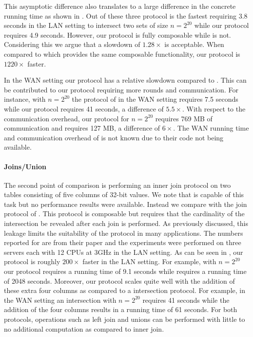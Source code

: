 This asymptotic difference also translates to a large difference in the concrete running time as shown in . Out of these three protocol \cite{CCS:KKRT16} is the fastest requiring 3.8 seconds in the LAN setting to intersect two sets of size $n=2^{20}$ while our protocol requires 4.9 seconds. However, our protocol is fully composable while \cite{CCS:KKRT16} is not. Considering this we argue that a slowdown of $1.28\times$ is acceptable. When compared to \cite{ASIACCS:BlaAgu12} which provides the same composable functionality, our protocol is $1220\times$ faster.

In the WAN setting our protocol has a relative slowdown compared to \cite{CCS:KKRT16}. This can be contributed to our protocol requiring more rounds and communication. For instance, with $n=2^{20}$ the protocol of \cite{CCS:KKRT16} in the WAN setting requires 7.5 seconds while our protocol requires 41 seconds, a difference of $5.5\times$. With respect to the communication overhead, our protocol for $n=2^{20}$ requires 769 MB of communication and \cite{CCS:KKRT16} requires 127 MB, a difference of $6\times$. The WAN running time and communication overhead of \cite{ASIACCS:BlaAgu12} is not known due to their code not being available.


\paragraph{Joins/Union} 
The second point of comparison is performing an inner join protocol on two tables consisting of five columns of 32-bit values. We note that \cite{ASIACCS:BlaAgu12} is capable of this task but no performance results were available. Instead we compare with the join protocol of \cite{LTW13}. This protocol is composable but requires that the cardinality of the intersection be revealed after each join is performed. As previously discussed, this leakage limits the suitability of the protocol in many applications. The numbers reported for \cite{LTW13} are from their paper and the experiments were performed on three servers each with 12 CPUs at 3GHz in the LAN setting. As can be seen in , our protocol is roughly $200\times$ faster in the LAN setting. For example, with $n=2^{20}$ our protocol requires a running time of 9.1 seconds while \cite{LTW13} requires a running time of 2048 seconds. Moreover, our protocol scales quite well with the addition of these extra four columns as compared to a intersection protocol. For example, in the WAN setting an intersection with $n=2^{20}$ requires 41 seconds while the addition of the four columns results in a  running time of 61 seconds. For both protocols, operations such as left join and unions can be performed with little to no additional computation as compared to inner join.

